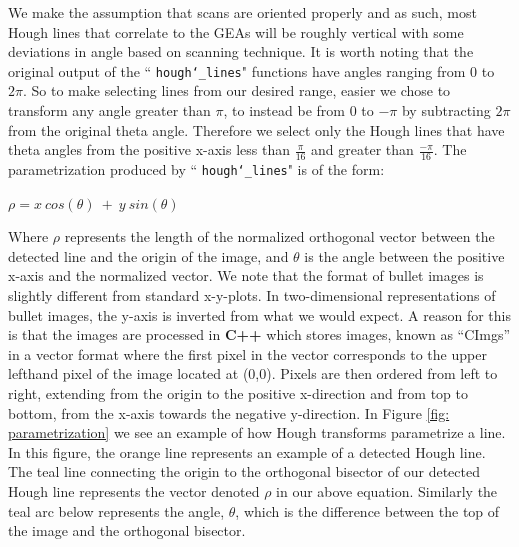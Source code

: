 \documentclass[12pt]{article}
\theoremstyle{nonumberplain}
\begin{document}
We make the assumption that scans are oriented properly and as such, most Hough lines that correlate to the GEAs will be roughly vertical with some deviations in angle based on scanning technique. It is worth noting that the original output of the `` \texttt{hough\char`_lines}" functions have angles ranging from 0 to $2\pi$. So to make selecting lines from our desired range, easier we chose to transform any angle greater than $\pi$, to instead be from 0 to $-\pi$ by subtracting $2\pi$ from the original theta angle. Therefore we select only the Hough lines that have theta angles from the positive x-axis less than $\frac{\pi}{16}$ and greater than $\frac{-\pi}{16}$. The parametrization produced by `` \texttt{hough\char`_lines}" is of the form:

\begin{center}
$\rho = x \ cos(\theta) \ + \ y \ sin(\theta)$
\end{center}

Where $\rho$ represents the length of the normalized orthogonal vector between the detected line and the origin of the image, and $\theta$ is the angle between the positive x-axis and the normalized vector. We note that the format of bullet images is slightly different from standard x-y-plots. In two-dimensional representations of bullet images, the y-axis is inverted from what we would expect. A reason for this is that the images are processed in \textbf{C++} which stores images, known as ``CImgs'' in a vector format where the first pixel in the vector corresponds to the upper lefthand pixel of the image located at (0,0). Pixels are then ordered from left to right, extending from the origin to the positive x-direction and from top to bottom, from the x-axis towards the negative y-direction. In Figure \ref{fig: parametrization} we see an example of how Hough transforms parametrize a line. In this figure, the orange line represents an example of a detected Hough line. The teal line connecting the origin to the orthogonal bisector of our detected Hough line represents the vector denoted $\rho$ in our above equation. Similarly the teal arc below represents the angle, $\theta$, which is the difference between the top of the image and the orthogonal bisector. 
\end{document}
